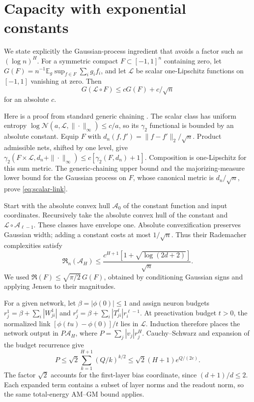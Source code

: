 \documentclass[11pt]{article}
\newcommand{\E}{\mathbb E}\newcommand{\R}{\mathbb R}\newcommand{\KL}{\operatorname{KL}}\newcommand{\op}{\mathrm{op}}
\begin{document}
\section{Capacity with exponential constants}
We state explicitly the Gaussian-process ingredient that avoids a factor such as $(\log n)^H$. For a symmetric compact $F\subset[-1,1]^n$ containing zero, let $G(F)=n^{-1}\E_g\sup_{f\in F}\sum_i g_i f_i$, and let $\mathcal L$ be scalar one-Lipschitz functions on $[-1,1]$ vanishing at zero. Then
\begin{equation}
 G(\mathcal L\circ F)\le cG(F)+c/\sqrt n
 \label{eq:scalar-link}
\end{equation}
for an absolute $c$.

Here is a proof from standard generic chaining \cite{talagrand}. The scalar class has uniform entropy $\log\mathcal N(a,\mathcal L,\|\cdot\|_\infty)\le c/a$, so its $\gamma_2$ functional is bounded by an absolute constant. Equip $F$ with $d_n(f,f')=\|f-f'\|_2/\sqrt n$. Product admissible nets, shifted by one level, give
$\gamma_2(F\times\mathcal L,d_n+\|\cdot\|_\infty)\le c[\gamma_2(F,d_n)+1]$.
Composition is one-Lipschitz for this sum metric. The generic-chaining upper bound and the majorizing-measure lower bound for the Gaussian process on $F$, whose canonical metric is $d_n/\sqrt n$, prove \eqref{eq:scalar-link}.

Start with the absolute convex hull $\mathcal A_0$ of the constant function and input coordinates. Recursively take the absolute convex hull of the constant and $\mathcal L\circ\mathcal A_{\ell-1}$. These classes have envelope one. Absolute convexification preserves Gaussian width; adding a constant costs at most $1/\sqrt n$. Thus their Rademacher complexities satisfy
\begin{equation}
 \mathfrak R_n(\mathcal A_H)
 \le\frac{c^{H+1}[1+\sqrt{\log(2d+2)}]}{\sqrt n}.
 \label{eq:atoms}
\end{equation}
We used $\mathfrak R(F)\le\sqrt{\pi/2}\,G(F)$, obtained by conditioning Gaussian signs and applying Jensen to their magnitudes.

For a given network, let $\beta=|\phi(0)|\le1$ and assign neuron budgets
$r_j^1=\beta+\sum_i|W^1_{ji}|$ and
$r_j^\ell=\beta+\sum_i|T^\ell_{ji}|r_i^{\ell-1}$.
At preactivation budget $t>0$, the normalized link
$[\phi(tu)-\phi(0)]/t$ lies in $\mathcal L$.
Induction therefore places the network output in $P\mathcal A_H$, where $P=\sum_j|v_j|r_j^H$. Cauchy--Schwarz and expansion of the budget recurrence give
\begin{equation}
 P\le\sqrt2\sum_{k=1}^{H+1}(Q/k)^{k/2}
 \le\sqrt2(H+1)e^{Q/(2e)}.
 \label{eq:path}
\end{equation}
The factor $\sqrt2$ accounts for the first-layer bias coordinate, since $(d+1)/d\le2$. Each expanded term contains a subset of layer norms and the readout norm, so the same total-energy AM--GM bound applies.
\end{document}
